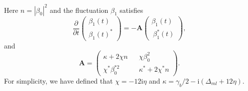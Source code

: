 \documentclass[pra,aps,superscriptaddress,showpacs,preprint]{revtex4}%
\begin{document}
Here $n=|\beta_{0}|^{2}$ and the fluctuation $\beta_{1}$ satisfies
\begin{equation}
\frac{\partial}{\partial t}
\begin{pmatrix}
\beta_{1}(t)\\ \beta_{1}(t)^{\ast}
\end{pmatrix}=-\textbf{A}
\begin{pmatrix}
\beta_{1}(t)\\\ \beta_{1}^{\ast}(t)
\end{pmatrix}
 \label{Eq:fluctuation equation},
\end{equation}
and
\begin{equation}
\textbf{A}=
\begin{pmatrix}
\kappa+2\chi n && \chi\beta_{0}^{2}\\
\chi^{\ast}\beta_{0}^{\ast 2} && \kappa^{\ast}+2\chi^{\ast}n
\end{pmatrix}
\label{Eq:A}.
\end{equation}
For simplicity, we have defined that $\chi=-12\mathrm{i}\eta$ and $\kappa=\gamma_{b}/2-\mathrm{i}(\Delta_{ml}+12\eta)$.
\end{document}
